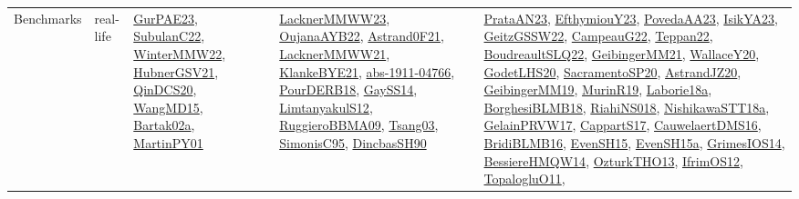 {\begin{longtable}{lp{3cm}>{\raggedright}p{6cm}>{\raggedright}p{6cm}p{8cm}}
Benchmarks & real-life & \href{articles/GurPAE23.pdf}{GurPAE23}\cite{GurPAE23}, \href{articles/SubulanC22.pdf}{SubulanC22}\cite{SubulanC22}, \href{papers/WinterMMW22.pdf}{WinterMMW22}\cite{WinterMMW22}, \href{articles/HubnerGSV21.pdf}{HubnerGSV21}\cite{HubnerGSV21}, \href{articles/QinDCS20.pdf}{QinDCS20}\cite{QinDCS20}, \href{articles/WangMD15.pdf}{WangMD15}\cite{WangMD15}, \href{papers/Bartak02a.pdf}{Bartak02a}\cite{Bartak02a}, \href{articles/MartinPY01.pdf}{MartinPY01}\cite{MartinPY01} & \href{articles/LacknerMMWW23.pdf}{LacknerMMWW23}\cite{LacknerMMWW23}, \href{papers/OujanaAYB22.pdf}{OujanaAYB22}\cite{OujanaAYB22}, \href{papers/Astrand0F21.pdf}{Astrand0F21}\cite{Astrand0F21}, \href{papers/LacknerMMWW21.pdf}{LacknerMMWW21}\cite{LacknerMMWW21}, \href{papers/KlankeBYE21.pdf}{KlankeBYE21}\cite{KlankeBYE21}, \href{articles/abs-1911-04766.pdf}{abs-1911-04766}\cite{abs-1911-04766}, \href{articles/PourDERB18.pdf}{PourDERB18}\cite{PourDERB18}, \href{papers/GaySS14.pdf}{GaySS14}\cite{GaySS14}, \href{articles/LimtanyakulS12.pdf}{LimtanyakulS12}\cite{LimtanyakulS12}, \href{articles/RuggieroBBMA09.pdf}{RuggieroBBMA09}\cite{RuggieroBBMA09}, \href{articles/Tsang03.pdf}{Tsang03}\cite{Tsang03}, \href{papers/SimonisC95.pdf}{SimonisC95}\cite{SimonisC95}, \href{articles/DincbasSH90.pdf}{DincbasSH90}\cite{DincbasSH90} & \href{articles/PrataAN23.pdf}{PrataAN23}\cite{PrataAN23}, \href{papers/EfthymiouY23.pdf}{EfthymiouY23}\cite{EfthymiouY23}, \href{papers/PovedaAA23.pdf}{PovedaAA23}\cite{PovedaAA23}, \href{articles/IsikYA23.pdf}{IsikYA23}\cite{IsikYA23}, \href{papers/GeitzGSSW22.pdf}{GeitzGSSW22}\cite{GeitzGSSW22}, \href{articles/CampeauG22.pdf}{CampeauG22}\cite{CampeauG22}, \href{papers/Teppan22.pdf}{Teppan22}\cite{Teppan22}, \href{papers/BoudreaultSLQ22.pdf}{BoudreaultSLQ22}\cite{BoudreaultSLQ22}, \href{papers/GeibingerMM21.pdf}{GeibingerMM21}\cite{GeibingerMM21}, \href{articles/WallaceY20.pdf}{WallaceY20}\cite{WallaceY20}, \href{papers/GodetLHS20.pdf}{GodetLHS20}\cite{GodetLHS20}, \href{articles/SacramentoSP20.pdf}{SacramentoSP20}\cite{SacramentoSP20}, \href{articles/AstrandJZ20.pdf}{AstrandJZ20}\cite{AstrandJZ20}, \href{papers/GeibingerMM19.pdf}{GeibingerMM19}\cite{GeibingerMM19}, \href{papers/MurinR19.pdf}{MurinR19}\cite{MurinR19}, \href{papers/Laborie18a.pdf}{Laborie18a}\cite{Laborie18a}, \href{articles/BorghesiBLMB18.pdf}{BorghesiBLMB18}\cite{BorghesiBLMB18}, \href{papers/RiahiNS018.pdf}{RiahiNS018}\cite{RiahiNS018}, \href{papers/NishikawaSTT18a.pdf}{NishikawaSTT18a}\cite{NishikawaSTT18a}, \href{papers/GelainPRVW17.pdf}{GelainPRVW17}\cite{GelainPRVW17}, \href{papers/CappartS17.pdf}{CappartS17}\cite{CappartS17}, \href{papers/CauwelaertDMS16.pdf}{CauwelaertDMS16}\cite{CauwelaertDMS16}, \href{articles/BridiBLMB16.pdf}{BridiBLMB16}\cite{BridiBLMB16}, \href{papers/EvenSH15.pdf}{EvenSH15}\cite{EvenSH15}, \href{articles/EvenSH15a.pdf}{EvenSH15a}\cite{EvenSH15a}, \href{articles/GrimesIOS14.pdf}{GrimesIOS14}\cite{GrimesIOS14}, \href{papers/BessiereHMQW14.pdf}{BessiereHMQW14}\cite{BessiereHMQW14}, \href{articles/OzturkTHO13.pdf}{OzturkTHO13}\cite{OzturkTHO13}, \href{papers/IfrimOS12.pdf}{IfrimOS12}\cite{IfrimOS12}, \href{articles/TopalogluO11.pdf}{TopalogluO11}\cite{TopalogluO11}, 
\end{longtable}}
